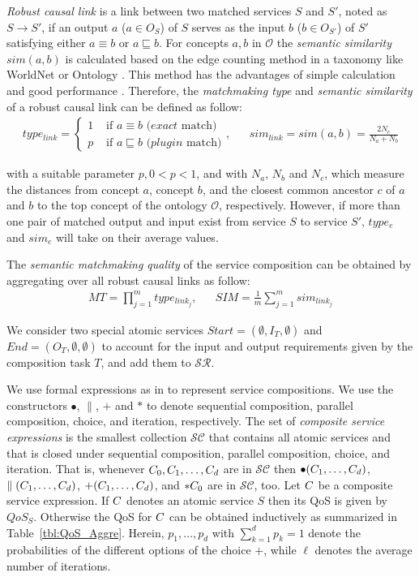 \emph{Robust causal link} \cite{lecue2008optimizing} is a link between two matched services $S$ and $S'$, noted as $S \rightarrow S'$, if an output $a$ ($a \in {O_S}$) of $S$ serves as the input $b$ ($b \in {O_{S'}}$) of $S'$ satisfying either $a \equiv b$ or $a \sqsubseteq b$.  For concepts $a, b$ in $\mathcal{O}$ the \emph{semantic similarity} $sim(a, b)$ is calculated based on the edge counting method in a taxonomy like WorldNet or Ontology \cite{shet2012new}. This method has the advantages of simple calculation and good performance \cite{shet2012new}. Therefore, the \emph{matchmaking type} and \emph{semantic similarity} of a robust causal link can be defined as follow:
\begin{align}
\label{eq_link}
type_{link} = 
\begin{cases}
	1 & \text{ if $a\equiv b$ ($exact$ match)}\\
	p & \text{ if $a \sqsubseteq b$ ($plugin$ match)}
\end{cases}
,&&
sim_{link} = sim(a,b) = \frac{2N_c}{N_{a}+N_{b}}
\end{align}

\noindent with a suitable parameter $p, 0<p< 1$, and with $N_a$, $N_b$ and $N_c$, which measure the distances from concept $a$, concept $b$, and the closest common ancestor $c$ of $a$ and $b$ to the top concept of the ontology $\mathcal{O}$, respectively. However, if more than one pair of matched output and input exist from service $S$ to service $S'$, $type_e$ and $sim_e$ will take on their average values.

The \emph{semantic matchmaking quality} of the service composition can be obtained by aggregating over all robust causal links as follow:
\begin{align}
MT {=} \prod_{j=1}^{m} type_ {link_{j}}
,&&
SIM {=} \frac{1}{m}\sum_{j=1}^m sim_ {link_{j}}  
\end{align}

We consider two special atomic services $Start = (\emptyset, I_T, \emptyset )$ and $End  = (O_T, \emptyset, \emptyset)$ to account for the input and output requirements given by the composition task $T$, and add them to $\mathcal{SR}$. 

We use formal expressions as in \cite{ma2012formal} to represent service compositions. We use the constructors $\bullet$, $\parallel$, $+$ and $\ast$ to denote sequential composition, parallel composition, choice, and iteration, respectively. The set of \emph{composite service expressions} is the smallest collection $\mathcal{SC}$ that contains all atomic services and that is closed under sequential composition, parallel composition, choice, and iteration. That is, whenever $C_0,C_1,\ldots,C_d$ are in $\mathcal{SC}$ then $\bullet(C_1,\ldots,C_d)$, $\parallel(C_1,\ldots,C_d)$, $+(C_1,\ldots,C_d)$, and $\ast C_0$ are in $\mathcal{SC}$, too. Let $C$ be a composite service expression. If $C$ denotes an atomic service $S$ then its QoS is given by $QoS_S$.  Otherwise the QoS for $C$ can be obtained inductively as summarized in Table~\ref{tbl:QoS_Aggre}. Herein, $p_1,\ldots,p_d$ with $\sum\limits^d_{k=1}p_k=1$ denote the probabilities of the different options of the choice $+$, while $\ell$ denotes the average number of iterations.

